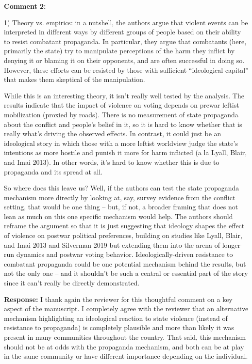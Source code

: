 \documentclass[12pt, a4paper, notitlepage]{article}
\begin{document}
\vspace{15pt}
\noindent\textbf{Comment 2:}
\begin{displayquote}
1) Theory vs. empirics: in a nutshell, the authors argue that violent events can be interpreted in different ways by different groups of people based on their ability to resist combatant propaganda. In particular, they argue that combatants (here, primarily the state) try to manipulate perceptions of the harm they inflict by denying it or blaming it on their opponents, and are often successful in doing so. However, these efforts can be resisted by those with sufficient “ideological capital” that makes them skeptical of the manipulation.

While this is an interesting theory, it isn’t really well tested by the analysis. The results indicate that the impact of violence on voting depends on prewar leftist mobilization (proxied by roads). There is no measurement of state propaganda about the conflict and people’s belief in it, so it is hard to know whether that is really what’s driving the observed effects. In contrast, it could just be an ideological story in which those with a more leftist worldview judge the state’s intentions as more hostile and punish it more for harm inflicted (a la Lyall, Blair, and Imai 2013). In other words, it’s hard to know whether this is due to propaganda and its spread at all.

So where does this leave us? Well, if the authors can test the state propaganda mechanism more directly by looking at, say, survey evidence from the conflict setting, that would be one thing – but, if not, a broader framing that does not lean as much on this one specific mechanism would help. The authors should reframe the argument so that it is just suggesting that ideology shapes the effect of violence on postwar political preferences, building on studies like Lyall, Blair, and Imai 2013 and Silverman 2019 but extending them into the arena of longer-run dynamics and postwar voting behavior. Ideologically-driven resistance to combatant propaganda could be one potential mechanism behind the results, but not the only one – and it shouldn’t be such a central or essential part of the story since it can’t really be directly demonstrated.
\end{displayquote}

\noindent\textbf{Response:} I thank again the reviewer for this thoughtful comment on a key aspect of the manuscript. I completely agree with the reviewer that an alternative mechanism highlighting an ideological reaction to state violence (instead of resistance to propaganda) is completely plausible and more than likely it was present in many communities throughout the country. That said, this mechanism should not be at odds with the propaganda mechanism, and both can be at play in the same community or have different importance depending on the individual.
\end{document}
